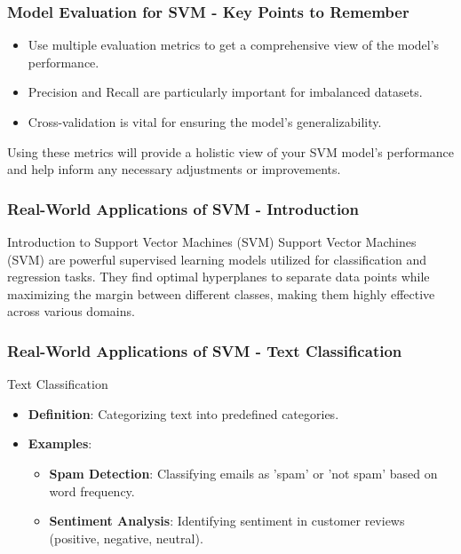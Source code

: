 \documentclass{beamer}
\begin{document}
\begin{frame}[fragile]
    \frametitle{Model Evaluation for SVM - Key Points to Remember}
    \begin{itemize}
        \item Use multiple evaluation metrics to get a comprehensive view of the model's performance.
        \item Precision and Recall are particularly important for imbalanced datasets.
        \item Cross-validation is vital for ensuring the model's generalizability.
    \end{itemize}
    
    Using these metrics will provide a holistic view of your SVM model's performance and help inform any necessary adjustments or improvements.
\end{frame}

\begin{frame}[fragile]
    \frametitle{Real-World Applications of SVM - Introduction}
    \begin{block}{Introduction to Support Vector Machines (SVM)}
        Support Vector Machines (SVM) are powerful supervised learning models utilized for classification and regression tasks. They find optimal hyperplanes to separate data points while maximizing the margin between different classes, making them highly effective across various domains.
    \end{block}
\end{frame}

\begin{frame}[fragile]
    \frametitle{Real-World Applications of SVM - Text Classification}
    \begin{block}{Text Classification}
        \begin{itemize}
            \item \textbf{Definition}: Categorizing text into predefined categories.
            \item \textbf{Examples}:
            \begin{itemize}
                \item \textbf{Spam Detection}: Classifying emails as 'spam' or 'not spam' based on word frequency.
                \item \textbf{Sentiment Analysis}: Identifying sentiment in customer reviews (positive, negative, neutral).
            \end{itemize}
        \end{itemize}
    \end{block}
\end{frame}
\end{document}
